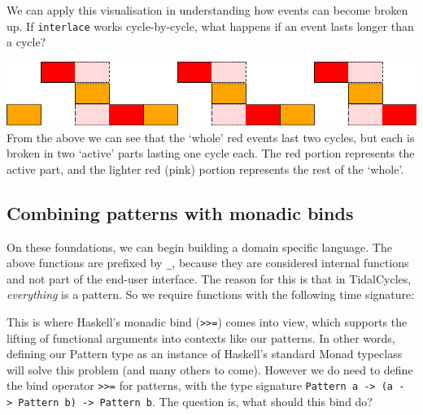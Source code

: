 We can apply this visualisation in understanding how events can become
broken up. If \texttt{interlace} works cycle-by-cycle, what happens if
an event lasts longer than a cycle?

\begin{Shaded}
\begin{Highlighting}[]
\OtherTok{=}\NormalTok{ interlace [atom } \OperatorTok{$}\NormalTok{]}
\end{Highlighting}
\end{Shaded}

\includegraphics{../figures/fig2.pdf}\\

From the above we can see that the `whole' red events last two cycles,
but each is broken in two `active' parts lasting one cycle each. The red
portion represents the active part, and the lighter red (pink) portion
represents the rest of the `whole'.

\subsection{Combining patterns with monadic
binds}\label{combining-patterns-with-monadic-binds}

On these foundations, we can begin building a domain specific language.
The above functions are prefixed by \texttt{\_}, because they are
considered internal functions and not part of the end-user interface.
The reason for this is that in TidalCycles, \emph{everything} is a
pattern. So we require functions with the following time signature:

\begin{Shaded}
\begin{Highlighting}[]
   \OtherTok{{-}\textgreater{}} \OtherTok{{-}\textgreater{}} 
\end{Highlighting}
\end{Shaded}

This is where Haskell's monadic bind
(\texttt{\textgreater{}\textgreater{}=}) comes into view, which supports
the lifting of functional arguments into contexts like our patterns. In
other words, defining our Pattern type as an instance of Haskell's
standard Monad typeclass will solve this problem (and many others to
come). However we do need to define the bind operator
\texttt{\textgreater{}\textgreater{}=} for patterns, with the type
signature
\texttt{Pattern\ a\ -\textgreater{}\ (a\ -\textgreater{}\ Pattern\ b)\ -\textgreater{}\ Pattern\ b}.
The question is, what should this bind do?

